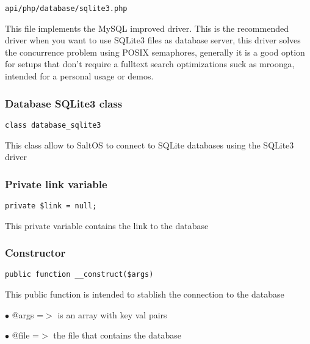 \documentclass[a4paper]{article}
\begin{document}
\begin{lstlisting}
api/php/database/sqlite3.php
\end{lstlisting}

This file implements the MySQL improved driver. This is the recommended driver when you want
to use SQLite3 files as database server, this driver solves the concurrence problem using
POSIX semaphores, generally it is a good option for setups that don't require a fulltext
search optimizations suck as mroonga, intended for a personal usage or demos.

\hypertarget{toc354}{}
\subsubsection{Database SQLite3 class}

\begin{lstlisting}
class database_sqlite3
\end{lstlisting}

This class allow to SaltOS to connect to SQLite databases using the SQLite3 driver

\hypertarget{toc355}{}
\subsubsection{Private link variable}

\begin{lstlisting}
private $link = null;
\end{lstlisting}

This private variable contains the link to the database

\hypertarget{toc356}{}
\subsubsection{Constructor}

\begin{lstlisting}
public function __construct($args)
\end{lstlisting}

This public function is intended to stablish the connection to the database

\begin{compactitem}
\item[\color{myblue}$\bullet$] @args =$>$ is an array with key val pairs
\item[\color{myblue}$\bullet$] @file =$>$ the file that contains the database
\end{compactitem}
\end{document}
